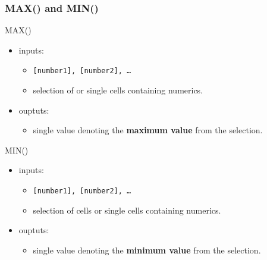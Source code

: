 \documentclass[12pt]{beamer}
\begin{document}
	\begin{frame}
		\frametitle{MAX() and MIN()}
			MAX()
			\begin{itemize}
				\item inputs:
				\begin{itemize}
					\item \texttt{[number1], [number2], \ldots}
					\item selection of or single cells containing numerics.
				\end{itemize}
				\item ouptuts:
				\begin{itemize}
					\item single value denoting the\textbf{ maximum value} from the selection.
				\end{itemize}
		\end{itemize}
		MIN() 
			\begin{itemize}
			\item inputs:
			\begin{itemize}
				\item \texttt{[number1], [number2], \ldots}
				\item selection of cells or single cells containing numerics. 
			\end{itemize}
			\item ouptuts:
			\begin{itemize}
				\item single value denoting the\textbf{ minimum value} from the selection.
			\end{itemize}
	\end{itemize}
	\end{frame}
\end{document}
